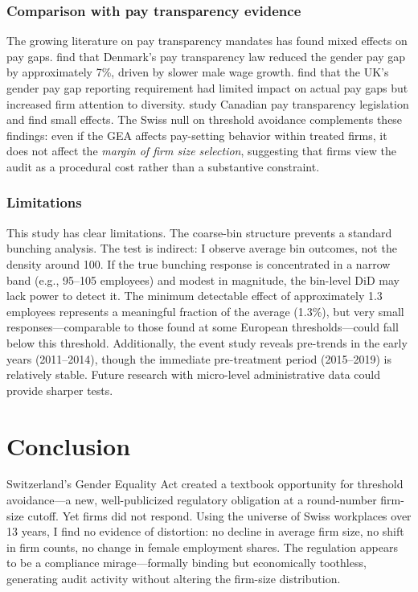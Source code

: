 \documentclass[12pt]{article}
\begin{document}
\subsubsection*{Comparison with pay transparency evidence} The growing literature on pay transparency mandates has found mixed effects on pay gaps. \citet{bennedsen2022firms} find that Denmark's pay transparency law reduced the gender pay gap by approximately 7\%, driven by slower male wage growth. \citet{duchini2020pay} find that the UK's gender pay gap reporting requirement had limited impact on actual pay gaps but increased firm attention to diversity. \citet{baker2023pay} study Canadian pay transparency legislation and find small effects. The Swiss null on threshold avoidance complements these findings: even if the GEA affects pay-setting behavior within treated firms, it does not affect the \emph{margin of firm size selection}, suggesting that firms view the audit as a procedural cost rather than a substantive constraint.

\subsubsection*{Limitations} This study has clear limitations. The coarse-bin structure prevents a standard bunching analysis. The test is indirect: I observe average bin outcomes, not the density around 100. If the true bunching response is concentrated in a narrow band (e.g., 95--105 employees) and modest in magnitude, the bin-level DiD may lack power to detect it. The minimum detectable effect of approximately 1.3 employees represents a meaningful fraction of the average (1.3\%), but very small responses---comparable to those found at some European thresholds---could fall below this threshold. Additionally, the event study reveals pre-trends in the early years (2011--2014), though the immediate pre-treatment period (2015--2019) is relatively stable. Future research with micro-level administrative data could provide sharper tests.


\section{Conclusion}

Switzerland's Gender Equality Act created a textbook opportunity for threshold avoidance---a new, well-publicized regulatory obligation at a round-number firm-size cutoff. Yet firms did not respond. Using the universe of Swiss workplaces over 13 years, I find no evidence of distortion: no decline in average firm size, no shift in firm counts, no change in female employment shares. The regulation appears to be a compliance mirage---formally binding but economically toothless, generating audit activity without altering the firm-size distribution.
\end{document}

